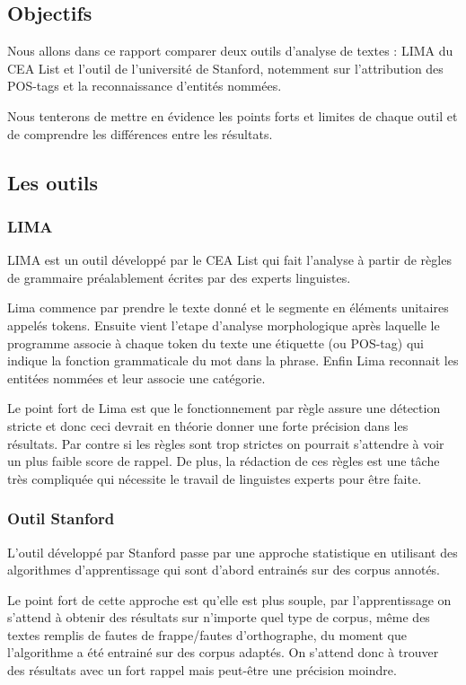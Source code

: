 \documentclass[12pt]{report}
\begin{document}
\subsection{Objectifs}

Nous allons dans ce rapport comparer deux outils d'analyse de textes : LIMA du CEA List et l'outil de l'université de Stanford, notemment sur l'attribution des POS-tags et la reconnaissance d'entités nommées.

Nous tenterons de mettre en évidence les points forts et limites de chaque outil et de comprendre les différences entre les résultats.

\subsection{Les outils}

\subsubsection{LIMA}

LIMA est un outil développé par le CEA List qui fait l'analyse à partir de règles de grammaire préalablement écrites par des experts linguistes.

Lima commence par prendre le texte donné et le segmente en éléments unitaires appelés tokens.
Ensuite vient l'etape d'analyse morphologique après laquelle le programme associe à chaque token du texte une étiquette (ou POS-tag) qui indique la fonction grammaticale du mot dans la phrase.
Enfin Lima reconnait les entitées nommées et leur associe une catégorie.

Le point fort de Lima est que le fonctionnement par règle assure une détection stricte et donc ceci devrait en théorie donner une forte précision dans les résultats. Par contre si les règles sont trop strictes on pourrait s'attendre à voir un plus faible score de rappel. De plus, la rédaction de ces règles est une tâche très compliquée qui nécessite le travail de linguistes experts pour être faite.

\subsubsection{Outil Stanford}
L'outil développé par Stanford passe par une approche statistique en utilisant des algorithmes d'apprentissage qui sont d'abord entrainés sur des corpus annotés. 

Le point fort de cette approche est qu'elle est plus souple, par l'apprentissage on s'attend à obtenir des résultats sur n'importe quel type de corpus, même des textes remplis de fautes de frappe/fautes d'orthographe, du moment que l'algorithme a été entrainé sur des corpus adaptés. On s'attend donc à trouver des résultats avec un fort rappel mais peut-être une précision moindre.
\end{document}
